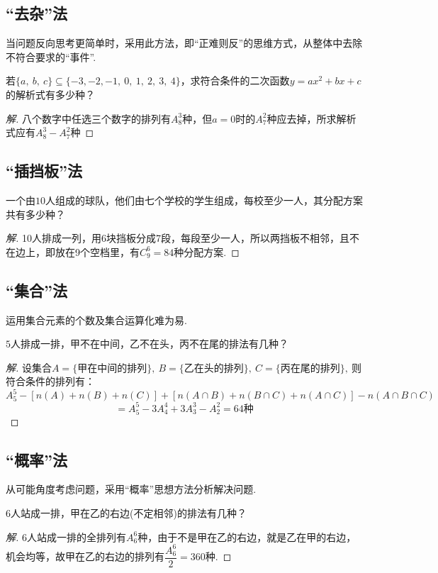 \documentclass[marginline,noindent,answers,adobefonts]{BHCexam}
\begin{document}
\subsection{“去杂”法}
当问题反向思考更简单时，采用此方法，即“正难则反”的思维方式，从整体中去除不符合要求的“事件”.\par
\begin{example}
若$\{a,~b,~c\}\subseteq \{-3,-2,-1,~0,~1,~2,~3,~4\}$，求符合条件的二次函数$ y=ax^2+bx+c $的解析式有多少种？
\end{example}
\begin{proof}[解]
八个数字中任选三个数字的排列有$ A_8^3 $种，但$ a=0 $时的$ A_7^2 $种应去掉，所求解析式应有$ A_8^3-A_7^2 $种
\end{proof}
\subsection{“插挡板”法}                                                     
\begin{example}
一个由$ 10 $人组成的球队，他们由七个学校的学生组成，每校至少一人，其分配方案共有多少种？
\end{example}
\begin{proof}[解]
10人排成一列，用6块挡板分成7段，每段至少一人，所以两挡板不相邻，且不在边上，即放在9个空档里，有$ C_9^6 =84$种分配方案.
\end{proof}
\subsection{“集合”法}
运用集合元素的个数及集合运算化难为易.\par
\begin{example}
$5$人排成一排，甲不在中间，乙不在头，丙不在尾的排法有几种？
\end{example}
\begin{proof}[解]
设集合$ A=\{\text{甲在中间的排列}\} ,~B=\{\text{乙在头的排列}\},~C=\{\text{丙在尾的排列}\},~$则符合条件的排列有：\[A_5^5-\left[n(A)+n(B)+n(C)\right]+\left[n(A\cap B)+n(B\cap C)+n(A\cap C)\right]-n(A\cap B\cap C)\]\[=A_5^5-3A_4^4+3A_3^3-A_2^2=64\text{种}\]
\end{proof}
 \subsection{   “概率”法   }
 从可能角度考虑问题，采用“概率”思想方法分析解决问题.\par
\begin{example}
$6$人站成一排，甲在乙的右边(不定相邻)的排法有几种？
\end{example}
\begin{proof}[解]
$6$人站成一排的全排列有$ A_6^6 $种，由于不是甲在乙的右边，就是乙在甲的右边，机会均等，故甲在乙的右边的排列有$ \dfrac{A_6^6}{2}=360 $种.
\end{proof}
\end{document}
